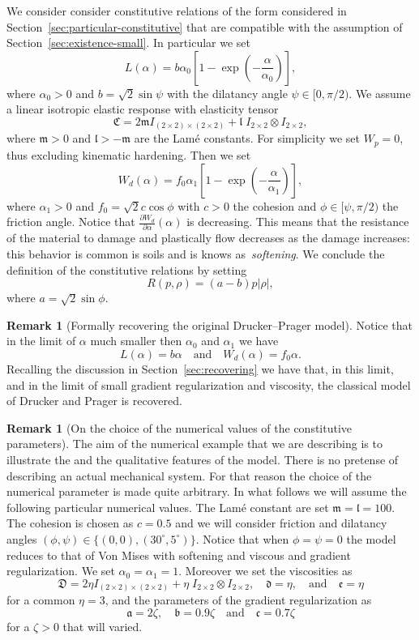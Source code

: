 \documentclass[a4paper,10pt,twoside]{amsbook}
\numberwithin{section}{chapter}
\numberwithin{equation}{chapter}
\theoremstyle{definition}
\newtheorem{rmk}[prop]{Remark}
\newcommand{\dind}[2]{\frac{\partial #1}{\partial #2}}
\begin{document}
We consider consider constitutive relations of the form considered in Section~\ref{sec:particular-constitutive} that are compatible with the assumption of Section~\ref{sec:existence-small}. In particular we set
\[
L(\alpha)=b\alpha_0\left[1-\exp\left(-\frac{\alpha}{\alpha_0}\right)\right],
\]
where $\alpha_0>0$ and $b=\sqrt{2}\sin\psi$ with the dilatancy angle $\psi\in[0,\pi/2)$. We assume a linear isotropic elastic response with elasticity tensor
\[
\mathfrak{C}=2\mathfrak{m}I_{(2\times2)\times(2\times2)}+\mathfrak{l}\;I_{2\times2}\otimes I_{2\times2},
\]
where $\mathfrak{m}>0$ and $\mathfrak{l}>-\mathfrak{m}$ are the Lamé constants. For simplicity we set $W_p=0$, thus excluding kinematic hardening. Then we set
\[
W_d(\alpha)=f_0\alpha_1\left[1-\exp\left(-\frac{\alpha}{\alpha_1}\right)\right],
\]
where $\alpha_1>0$ and $f_0=\sqrt{2}c\cos\phi$ with $c>0$ the cohesion and $\phi\in[\psi,\pi/2)$ the friction angle. Notice that $\dind{W_d}{\alpha}(\alpha)$ is decreasing. This means that the resistance of the material to damage and plastically flow decreases as the damage increases: this behavior is common is soils and is knows as~\emph{softening}. We conclude the definition of the constitutive relations by setting
\[
R(p,\rho)=(a-b)p|\rho|,
\]
where $a=\sqrt{2}\sin\phi$.
\begin{rmk}[Formally recovering the original Drucker--Prager model]
Notice that in the limit of $\alpha$ much smaller then $\alpha_0$ and $\alpha_1$ we have
\[
L(\alpha)=b\alpha\quad\text{and}\quad W_d(\alpha)=f_0\alpha.
\]
Recalling the discussion in Section~\ref{sec:recovering} we have that, in this limit, and in the limit of small gradient regularization and viscosity, the classical model of Drucker and Prager is recovered.
\end{rmk}
\begin{rmk}[On the choice of the numerical values of the constitutive parameters]
The aim of the numerical example that we are describing is to illustrate the and the qualitative features of the model. There is no pretense of describing an actual mechanical system. For that reason the choice of the numerical parameter is made quite arbitrary. In what follows we will assume the following particular numerical values. The Lamé constant are set $\mathfrak{m}=\mathfrak{l}=100$. The cohesion is chosen as $c=0.5$ and we will consider friction and dilatancy angles $(\phi,\psi)\in\{(0,0),(30^\circ,5^\circ)\}$. Notice that when $\phi=\psi=0$ the model reduces to that of Von Mises with softening and viscous and gradient regularization. We set $\alpha_0=\alpha_1=1$. Moreover we set the viscosities as
\[
\mathfrak{D}=2\eta I_{(2\times2)\times(2\times2)}+\eta\;I_{2\times2}\otimes I_{2\times2},\quad\mathfrak{d}=\eta,\quad\text{and}\quad\mathfrak{e}=\eta
\]
for a common $\eta=3$, and the parameters of the gradient regularization as
\[
\mathfrak{a}=2\zeta,\quad\mathfrak{b}=0.9\zeta\quad\text{and}\quad\mathfrak{c}=0.7\zeta
\]
for a $\zeta>0$ that will varied.
\end{rmk}
\end{document}

